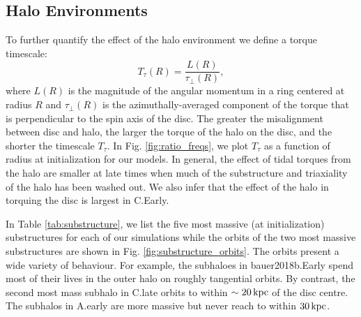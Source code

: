 \subsection{Halo Environments} \label{ssec:halo_env}

To further quantify the effect of the halo environment we define a
torque timescale:
\begin{equation}
T_\tau(R) = \frac{L(R)}{\tau_\perp(R)},
\end{equation}
where $L(R)$ is the magnitude of the angular momentum in a ring
centered at radius $R$ and $\tau_\perp(R)$ is the azimuthally-averaged
component of the torque that is perpendicular to the spin axis of the
disc.  The greater the misalignment between disc and halo, the larger
the torque of the halo on the disc, and the shorter the timescale
$T_\tau$. In Fig. \ref{fig:ratio_freqs}, we plot $T_\tau$ as a
function of radius at initialization for our models. In general, the
effect of tidal torques from the halo are smaller at late times when
much of the substructure and triaxiality of the halo has been washed
out. We also infer that the effect of the halo in torquing the disc is
largest in C.Early.

In Table \ref{tab:substructure}, we list the five most massive (at
initialization) substructures for each of our simulations while the
orbits of the two most massive substructures are shown in
Fig. \ref{fig:substructure_orbits}.  The orbits present a wide variety
of behaviour. For example, the subhaloes in bauer2018b.Early spend
most of their lives in the outer halo on roughly tangential orbits. By
contrast, the second most mass subhalo in C.late orbits to within
$\sim 20\,{\rm kpc}$ of the disc centre. The subhalos in A.early are
more massive but never reach to within $30\,{\rm kpc}$.

